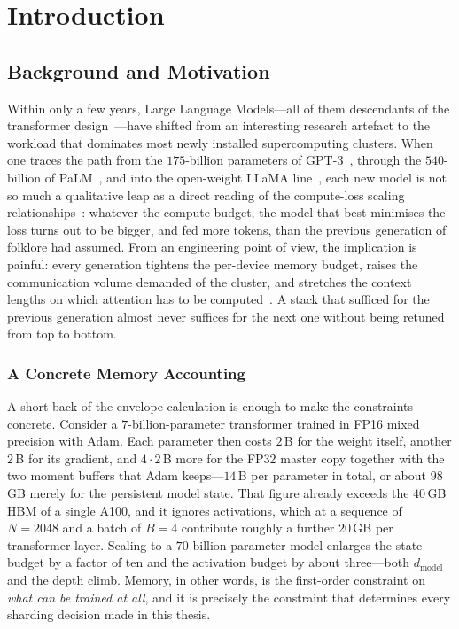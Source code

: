 \chapter{Introduction}\label{ch:introduction}

\section{Background and Motivation}\label{sec:intro_background}
Within only a few years, Large Language Models---all of them
descendants of the transformer design~\cite{vaswani2017attention}---have
shifted from an interesting research artefact to the workload that
dominates most newly installed supercomputing clusters. When one
traces the path from the $175$-billion parameters of
GPT-3~\cite{brown2020gpt3}, through the $540$-billion of
PaLM~\cite{chowdhery2022palm}, and into the open-weight LLaMA
line~\cite{touvron2023llama,touvron2023llama2}, each new model is
not so much a qualitative leap as a direct reading of the compute-loss
scaling relationships~\cite{kaplan2020scaling,hoffmann2022chinchilla}:
whatever the compute budget, the model that best minimises the loss
turns out to be bigger, and fed more tokens, than the previous
generation of folklore had assumed. From an engineering point of view,
the implication is painful: every generation tightens the
per-device memory budget, raises the communication volume demanded
of the cluster, and stretches the context lengths on which attention
has to be computed~\cite{rajbhandari2019zero,shoeybi2019megatron}. A
stack that sufficed for the previous generation almost never suffices
for the next one without being retuned from top to bottom.

\subsection{A Concrete Memory Accounting}\label{sec:intro_memory_example}
A short back-of-the-envelope calculation is enough to make the
constraints concrete. Consider a $7$-billion-parameter transformer
trained in FP16 mixed precision with Adam. Each parameter then costs
$2$\,B for the weight itself, another $2$\,B for its gradient, and
$4 \cdot 2$\,B more for the FP32 master copy together with the two
moment buffers that Adam keeps---$14$\,B per parameter in total, or
about $98$\,GB merely for the persistent model state. That figure
already exceeds the $40$\,GB HBM of a single A100, and it ignores
activations, which at a sequence of $N{=}2048$ and a batch of $B{=}4$
contribute roughly a further $20$\,GB per transformer layer. Scaling
to a $70$-billion-parameter model enlarges the state budget by a factor
of ten and the activation budget by about three---both $d_{\text{model}}$
and the depth climb. Memory, in other words, is the first-order
constraint on \emph{what can be trained at all}, and it is precisely
the constraint that determines every sharding decision made in this
thesis.

